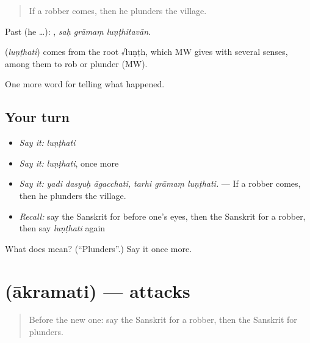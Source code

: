\begin{quote}
If a robber comes, then he plunders the village.
\end{quote}

Past (he …):   , \emph{saḥ grāmaṃ luṇṭhitavān}.

\begin{cousinweb}
\textbf{} (\emph{luṇṭhati}) comes from the root √luṇṭh, which MW gives with several senses, among them to rob or plunder (MW).
\end{cousinweb}

\begin{grammarlens}[title={What you've built}]
One more word for telling what happened.
\end{grammarlens}

\subsection*{Your turn}
\begin{itemize}
\raggedright
  \item \emph{Say it:} \emph{luṇṭhati}
  \item \emph{Say it:} \emph{luṇṭhati}, once more
  \item \emph{Say it:} \emph{yadi dasyuḥ āgacchati, tarhi grāmaṃ luṇṭhati.} — If a robber comes, then he plunders the village.
  \item \emph{Recall:} say the Sanskrit for before one's eyes, then the Sanskrit for a robber, then say \emph{luṇṭhati} again
\end{itemize}

\begin{tcolorbox}[breakable,colback=teal!4,colframe=teal!35!black,title={Before you move on}]
What does  mean? (\textquotedblleft{}Plunders\textquotedblright{}.) Say it once more.
\end{tcolorbox}
\section[\texorpdfstring{\sk{आक्रमति} (ākramati)}{आक्रमति (ākramati)}]{ (ākramati) — attacks}

\label{lesson:SA-C290-akramati}



\begin{quote}
Before the new one: say the Sanskrit for a robber, then the Sanskrit for plunders.
\end{quote}

